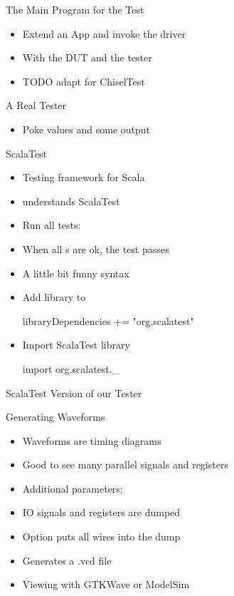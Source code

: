 \begin{frame}[fragile]{The Main Program for the Test}
\begin{itemize}
\item Extend an App and invoke the  driver
\item With the DUT and the tester
\item TODO adapt for ChiselTest
\end{itemize}
\end{frame}

\begin{frame}[fragile]{A Real Tester}
\begin{itemize}
\item Poke values and  some output
\end{itemize}
\end{frame}

\begin{frame}[fragile]{ScalaTest}
\begin{itemize}
\item Testing framework for Scala
\item {} understands ScalaTest
\item Run all tests:
\item When all s are ok, the test passes
\item A little bit funny syntax
\item Add library to 
\begin{chisel}
libraryDependencies += "org.scalatest" %
\end{chisel}
\item Import ScalaTest library
\begin{chisel}
import org.scalatest._
\end{chisel}
\end{itemize}
\end{frame}

\begin{frame}[fragile]{ScalaTest Version of our Tester}
\end{frame}

\begin{frame}[fragile]{Generating Waveforms}
\begin{itemize}
\item Waveforms are timing diagrams
\item Good to see many parallel signals and registers
\item Additional parameters: 
\item IO signals and registers are dumped
\item Option  puts all wires into the dump
\item Generates a .vcd file
\item Viewing with GTKWave or ModelSim
\end{itemize}
\end{frame}


